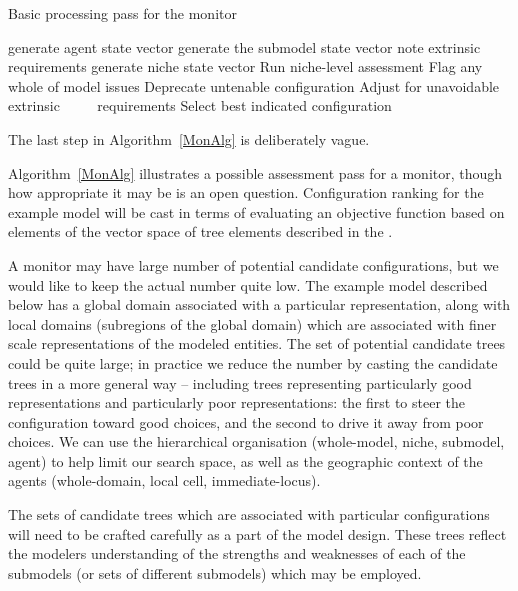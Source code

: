 \begin{algorithm}\label{MonAlg}
  \caption{Basic processing pass for the monitor}
  \begin{algorithmic}
    \State generate agent state vector
    \State generate the sub\-model state vector
    \State \qquad note extrinsic requirements
    \EndFor
    \EndFor
    \State
    \State generate niche state vector
    \EndFor
    \State
    \State Run niche-level assessment
    \State Flag any whole of model issues
    \State Deprecate untenable con\-fig\-ur\-a\-tion
    \State Adjust for unavoidable extrinsic
    \State $\qquad$ requirements
    \EndFor
    \State
    \State Select best indicated con\-fig\-ur\-a\-tion
  \end{algorithmic}
\end{algorithm} The last step in Algorithm~\ref{MonAlg} is deliberately vague. 

Algorithm~\ref{MonAlg} illustrates a possible
assessment pass for a monitor, though how appropriate it may be is an
open question. Configuration ranking for the example model will be
cast in terms of evaluating an objective function based on elements of
the vector space of tree elements described in the \appendixname.

A monitor may have large number of potential candidate con\-fig\-ur\-a\-tions,
but we would like to keep the actual number quite low. The example
model described below has a global domain associated with a particular
rep\-re\-sen\-ta\-tion, along with local domains (subregions of the global
domain) which are associated with finer scale rep\-re\-sen\-ta\-tions of the
modeled entities. The set of potential candidate trees could be quite
large; in practice we reduce the number by casting the candidate trees
in a more general way -- including trees representing particularly
good rep\-re\-sen\-ta\-tions and particularly poor rep\-re\-sen\-ta\-tions: the first
to steer the con\-fig\-ur\-a\-tion toward good choices, and the second to
drive it away from poor choices. We can use the hierarchical
organisation (whole-model, niche, sub\-model, agent) to help limit our
search space, as well as the geographic context of the agents (whole-domain, local
cell, immediate-locus).

The sets of candidate trees which are associated with particular
con\-fig\-ur\-a\-tions will need to be crafted carefully as a part of the
model design. These trees reflect the modelers understanding of the
strengths and weaknesses of each of the sub\-models (or sets of
different sub\-models) which may be employed.

